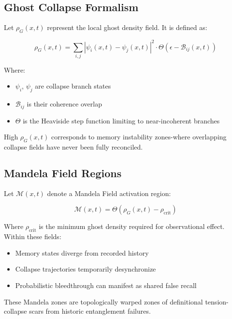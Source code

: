 \subsection{Ghost Collapse Formalism}

Let \( \rho_G(x,t) \) represent the local ghost density field. It is defined as:

\begin{equation}
\rho_G(x,t) = \sum_{i,j} \left| \psi_i(x,t) - \psi_j(x,t) \right|^2 \cdot \Theta\left( \epsilon - \mathcal{B}_{ij}(x,t) \right)
\end{equation}

Where:
\begin{itemize}
    \item \( \psi_i \), \( \psi_j \) are collapse branch states
    \item \( \mathcal{B}_{ij} \) is their coherence overlap
    \item \( \Theta \) is the Heaviside step function limiting to near-incoherent branches
\end{itemize}

High \( \rho_G(x,t) \) corresponds to memory instability zones-where overlapping collapse fields have never been fully reconciled.

\subsection{Mandela Field Regions}

Let \( \mathcal{M}(x,t) \) denote a Mandela Field activation region:

\begin{equation}
\mathcal{M}(x,t) = \Theta\left( \rho_G(x,t) - \rho_{\text{crit}} \right)
\end{equation}

Where \( \rho_{\text{crit}} \) is the minimum ghost density required for observational effect. Within these fields:
\begin{itemize}
    \item Memory states diverge from recorded history
    \item Collapse trajectories temporarily desynchronize
    \item Probabilistic bleedthrough can manifest as shared false recall
\end{itemize}

These Mandela zones are topologically warped zones of definitional tension-collapse scars from historic entanglement failures.

